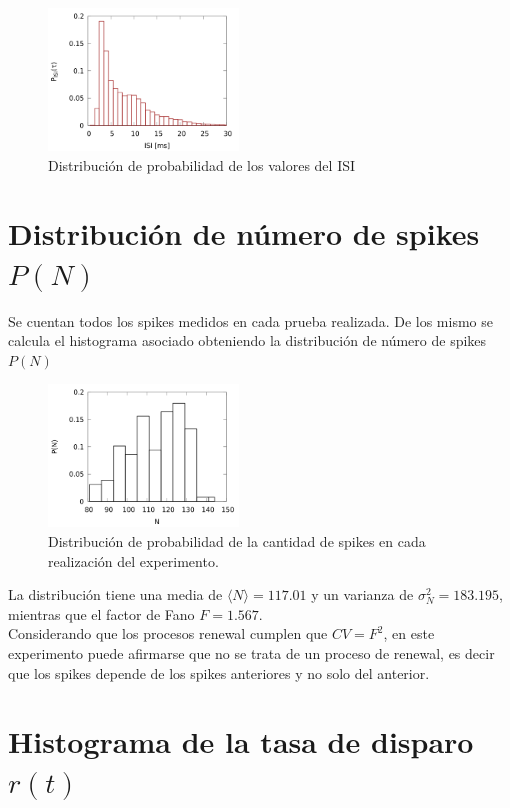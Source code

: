 \begin{figure}[H]
	\centering
	\includegraphics[width=0.45\textwidth]{../Graficos/p_isi.png}
	\caption{Distribución de probabilidad de los valores del ISI}
	\label{p_isi}
	\end{figure}

\section*{Distribución de número de spikes \texorpdfstring{$P(N)$}{}}

Se cuentan todos los spikes medidos en cada prueba realizada. De los mismo se calcula el histograma asociado obteniendo la distribución de número de spikes $P(N)$
\begin{figure}[H]
	\centering
	\includegraphics[width=0.45\textwidth]{../Graficos/p_N.png}
	\caption{Distribución de probabilidad de la cantidad de spikes en cada realización del experimento.}
\end{figure}


La distribución tiene una media de $\langle N \rangle = 117.01$ y un varianza de $\sigma^2_{N}=183.195$, mientras que el factor de Fano $F=1.567$.\\

Considerando que los procesos renewal cumplen que $CV=F^2$, en este experimento puede afirmarse que no se trata de un proceso de renewal, es decir que los spikes depende de los spikes anteriores y no solo del anterior.



\section*{Histograma de la tasa de disparo \texorpdfstring{$r(t)$}{}}

